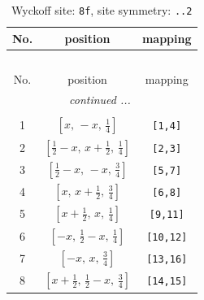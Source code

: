 \documentclass[fleqn,8pt]{jsarticle}
\begin{document}
\begin{longtable}{ccc}
\caption{Wyckoff site: {\tt 8f}, site symmetry: {\tt ..2}}
 \\
 \hline \hline
No. & position & mapping \\ \hline \endfirsthead

\multicolumn{2}{l}{\tablename\ \thetable{}} \\
 \hline \hline
No. & position & mapping \\ \hline \endhead

 \hline \hline
\multicolumn{2}{r}{\footnotesize\it continued ...} \\ \endfoot

 \hline \hline
\multicolumn{2}{r}{} \\ \endlastfoot

1 & $\left[ x,\, - x,\, \frac{1}{4} \right]$ & {\tt [1,4]} \\ \hline
2 & $\left[ \frac{1}{2} - x,\, x + \frac{1}{2},\, \frac{1}{4} \right]$ & {\tt [2,3]} \\ \hline
3 & $\left[ \frac{1}{2} - x,\, - x,\, \frac{3}{4} \right]$ & {\tt [5,7]} \\ \hline
4 & $\left[ x,\, x + \frac{1}{2},\, \frac{3}{4} \right]$ & {\tt [6,8]} \\ \hline
5 & $\left[ x + \frac{1}{2},\, x,\, \frac{1}{4} \right]$ & {\tt [9,11]} \\ \hline
6 & $\left[ - x,\, \frac{1}{2} - x,\, \frac{1}{4} \right]$ & {\tt [10,12]} \\ \hline
7 & $\left[ - x,\, x,\, \frac{3}{4} \right]$ & {\tt [13,16]} \\ \hline
8 & $\left[ x + \frac{1}{2},\, \frac{1}{2} - x,\, \frac{3}{4} \right]$ & {\tt [14,15]} \\
\end{longtable}
\renewcommand{\arraystretch}{1.2}
\end{document}
